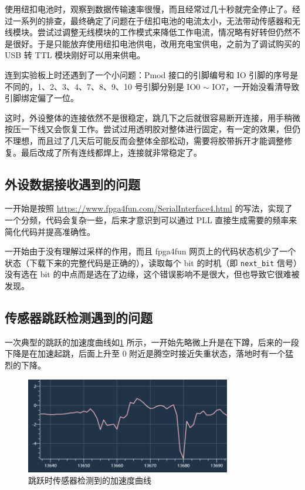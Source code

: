 \documentclass[UTF8, 11pt, fontset=none]{ctexart}
\begin{document}
使用纽扣电池时，观察到数据传输速率很慢，而且经常过几十秒就完全停止了。经过一系列的排查，最终确定了问题在于纽扣电池的电流太小，无法带动传感器和无线模块。尝试过调整无线模块的工作模式来降低工作电流，情况略有好转但仍然不是很好。于是只能放弃使用纽扣电池供电，改用充电宝供电，之前为了调试购买的 USB 转 TTL 模块刚好可以用来供电。

连到实验板上时还遇到了一个小问题：Pmod 接口的引脚编号和 IO 引脚的序号是不同的，1、2、3、4、7、8、9、10 号引脚分别是 IO0 $\sim$ IO7，一开始没看清导致引脚绑定偏了一位。

这时，外设整体的连接依然不是很稳定，跳几下之后就很容易断开连接，用手稍微按压一下线又会恢复工作。尝试过用透明胶对整体进行固定，有一定的效果，但仍不理想，而且过了几天后可能反而会整体全部松动，需要将胶带拆开才能调整修复。最后改成了所有连线都焊上，连接就非常稳定了。

\subsection{外设数据接收遇到的问题}

一开始是按照 \url{https://www.fpga4fun.com/SerialInterface4.html} 的写法，实现了一个分频，代码会复杂一些，后来才意识到可以通过 PLL 直接生成需要的频率来简化代码并提高准确性。

一开始由于没有理解过采样的作用，而且 fpga4fun 网页上的代码状态机少了一个状态（下载下来的完整代码是正确的），读取每个 bit 的时机（即 \texttt{next_bit} 信号）没有选在 bit 的中点而是选在了边缘，这个错误影响不是很大，但也导致它很难被发现。

\subsection{传感器跳跃检测遇到的问题}

一次典型的跳跃的加速度曲线如\cref{sensor-jump} 所示，一开始先略微上升是在下蹲，后来的一段下降是在加速起跳，后面上升至 0 附近是腾空时接近失重状态，落地时有一个猛烈的下降。

\begin{figure}[ht]
    \centering
    \includegraphics[width=0.8\textwidth]{images/sensor-jump.png}
    \caption{跳跃时传感器检测到的加速度曲线}
    \label{sensor-jump}
\end{figure}
\end{document}
